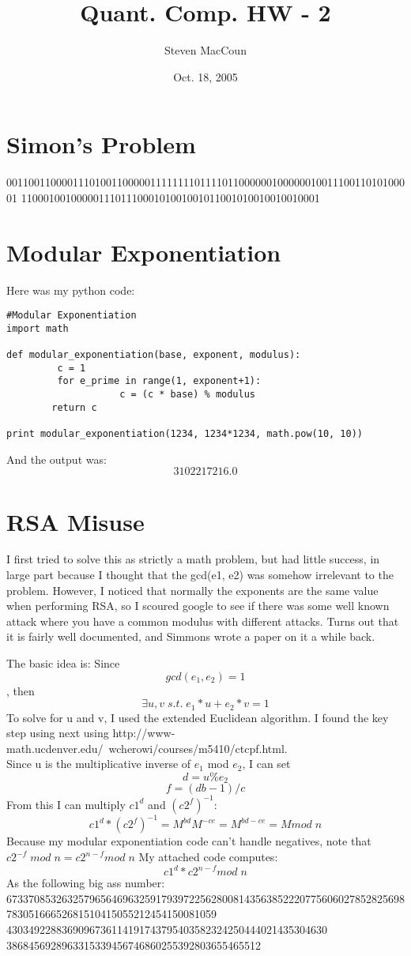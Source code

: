 \documentclass[12pt]{article}
\title{Quant. Comp. HW - 2}
\author{Steven MacCoun}
\date{Oct. 18, 2005}
\begin{document}
\maketitle						%



\section{Simon's Problem}
00110011000011101001100000111111110111101100000010000001001110011010100001
110001001000001110111000101001001011001010010010010001

\section{Modular Exponentiation}

Here was my python code:

\begin{verbatim}
#Modular Exponentiation
import math

def modular_exponentiation(base, exponent, modulus):
         c = 1
         for e_prime in range(1, exponent+1):
                    c = (c * base) % modulus
        return c

print modular_exponentiation(1234, 1234*1234, math.pow(10, 10))
\end{verbatim}
And the output was: \[\boxed{3102217216.0}\] 


\section{RSA Misuse}

I first tried to solve this as strictly a math problem, but had little success, in large part because I thought that
the gcd(e1, e2) was somehow irrelevant to the problem. However, I noticed that normally the exponents are the same value
when performing RSA, so I scoured google to see if there was some well known attack where you have a common modulus with
different attacks. Turns out that it is fairly well documented, and Simmons wrote a paper on it a while back.

The basic idea is:
Since \[gcd(e_1,e_2) = 1\],
then \[\exists u, v   \;  s.t.   \;  e_1*u + e_2*v = 1\]
To solve for u and v, I used the extended Euclidean algorithm.
I found the key step using next using http://www-math.ucdenver.edu/~wcherowi/courses/m5410/ctcpf.html.
\\Since u is the multiplicative inverse of $e_1$ mod $e_2$, I can set  \[d = u \% e_2\] \[f = (db-1)/c\]
From this I can multiply $c1^d$ and $(c2^f)^{-1}$: \[c1^d * (c2^f)^{-1} = M^{bd}M^{-ce} = M^{bd-ce}=M mod  \; n\]
Because my modular exponentiation code can't handle negatives, note that $c2^{-f} \; mod \; n = c2^{n-f} mod \; n$
My attached code computes: \[c1^d * c2^{n-f} mod \; n\] As the following big ass number:
\\673370853263257965646963259179397225628008143563852220775606027852825698\\78305166652681510415055212454150081059
\\4303492288369096736114191743795403582324250444021435304630
\\3868456928963315339456746860255392803655465512
\end{document}
